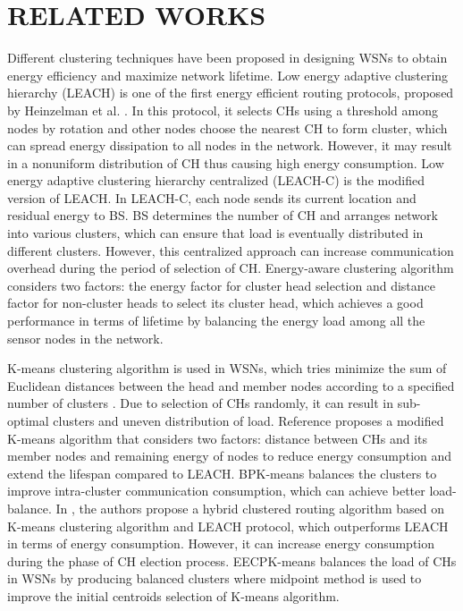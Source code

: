 \documentclass[journal,twoside,web]{ieeecolor}
\begin{document}
\section{RELATED WORKS}
Different clustering techniques have been proposed in designing WSNs to obtain energy efficiency and maximize network lifetime. Low energy adaptive clustering hierarchy (LEACH) is one of the first energy efficient routing protocols, proposed by Heinzelman et al. \cite{b9}. In this protocol, it selects CHs using a threshold among nodes by rotation and other nodes choose the nearest CH to form cluster, which can spread energy dissipation to all nodes in the network. However, it may result in a nonuniform distribution of CH thus causing high energy consumption. Low energy adaptive clustering hierarchy centralized (LEACH-C) \cite{b10} is the modified version of LEACH. In LEACH-C, each node sends its current location and residual energy to BS. BS determines the number of CH and arranges network into various clusters, which can ensure that load is eventually distributed in different clusters. However, this centralized approach can increase communication overhead during the period of selection of CH. Energy-aware clustering algorithm \cite{b11} considers two factors: the energy factor for cluster head selection and distance factor for non-cluster heads to select its cluster head, which achieves a good performance in terms of lifetime by balancing the energy load among all the sensor nodes in the network. 

K-means clustering algorithm is used in WSNs, which tries minimize the sum of Euclidean distances between the head and member nodes according to a specified number of clusters \cite{b4}. Due to selection of CHs randomly, it can result in sub-optimal clusters and uneven distribution of load. Reference \cite{b12} proposes a modified K-means algorithm that considers two factors: distance between CHs and its member nodes and remaining energy of nodes to reduce energy consumption and extend the lifespan compared to LEACH. BPK-means \cite{b13} balances the clusters to improve intra-cluster communication consumption, which can achieve better load-balance. In \cite{b14}, the authors propose a hybrid clustered routing algorithm based on K-means clustering algorithm and LEACH protocol, which outperforms LEACH in terms of energy consumption. However, it can increase energy consumption during the phase of CH election process. EECPK-means \cite{b15} balances the load of CHs in WSNs by producing balanced clusters where midpoint method is used to improve the initial centroids selection of K-means algorithm.
\end{document}
